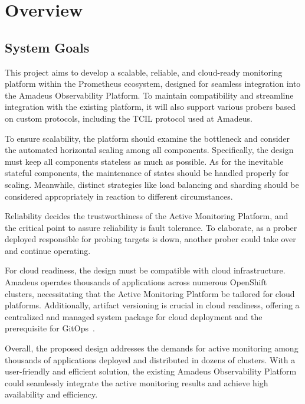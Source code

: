 
\chapter{Overview}\label{chapter:overview}

\section{System Goals}

This project aims to develop a scalable, reliable, and cloud-ready monitoring platform within the Prometheus ecosystem, designed for seamless integration into the Amadeus Observability Platform. To maintain compatibility and streamline integration with the existing platform, it will also support various probers based on custom protocols, including the \ac{TCIL} protocol used at Amadeus. 

To ensure scalability, the platform should examine the bottleneck and consider the automated horizontal scaling among all components. Specifically, the design must keep all components stateless as much as possible. As for the inevitable stateful components, the maintenance of states should be handled properly for scaling. Meanwhile, distinct strategies like load balancing and sharding should be considered appropriately in reaction to different circumstances. 

Reliability decides the trustworthiness of the Active Monitoring Platform, and the critical point to assure reliability is fault tolerance. To elaborate, as a prober deployed responsible for probing targets is down, another prober could take over and continue operating. 

For cloud readiness, the design must be compatible with cloud infrastructure. Amadeus operates thousands of applications across numerous OpenShift~\parencite{RedHatOpenShift} clusters, necessitating that the Active Monitoring Platform be tailored for cloud platforms. Additionally, artifact versioning is crucial in cloud readiness, offering a centralized and managed system package for cloud deployment and the prerequisite for GitOps~\parencite{WeaveworksWeavegitopsWeave}. 

Overall, the proposed design addresses the demands for active monitoring among thousands of applications deployed and distributed in dozens of clusters. With a user-friendly and efficient solution, the existing Amadeus Observability Platform could seamlessly integrate the active monitoring results and achieve high availability and efficiency. 

